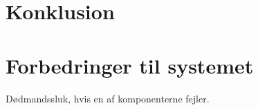 \chapter{Konklusion}

\chapter{Forbedringer til systemet}
Dødmandssluk, hvis en af komponenterne fejler.